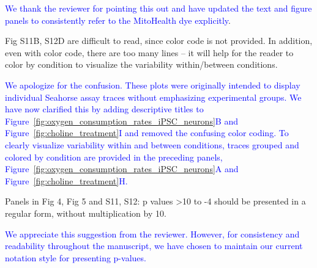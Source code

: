 \textcolor{blue}{We thank the reviewer for pointing this out and have updated the text and figure panels to consistently refer to the MitoHealth dye explicitly}.

Fig S11B, S12D are difficult to read, since color code is not provided. In addition, even with color code, there are too many lines – it will help for the reader to color by condition to visualize the variability within/between conditions.

\textcolor{blue}{We apologize for the confusion. These plots were originally intended to display individual Seahorse assay traces without emphasizing experimental groups. We have now clarified this by adding descriptive titles to Figure~\ref{fig:oxygen_consumption_rates_iPSC_neurons}B and Figure~\ref{fig:choline_treatment}I and removed the confusing color coding. To clearly visualize variability within and between conditions, traces grouped and colored by condition are provided in the preceding panels, Figure~\ref{fig:oxygen_consumption_rates_iPSC_neurons}A and Figure~\ref{fig:choline_treatment}H.}

Panels in Fig 4, Fig 5 and S11, S12: p values >10 to -4 should be presented in a regular form, without multiplication by 10.

\textcolor{blue}{We appreciate this suggestion from the reviewer. However, for consistency and readability throughout the manuscript, we have chosen to maintain our current notation style for presenting p-values.}
